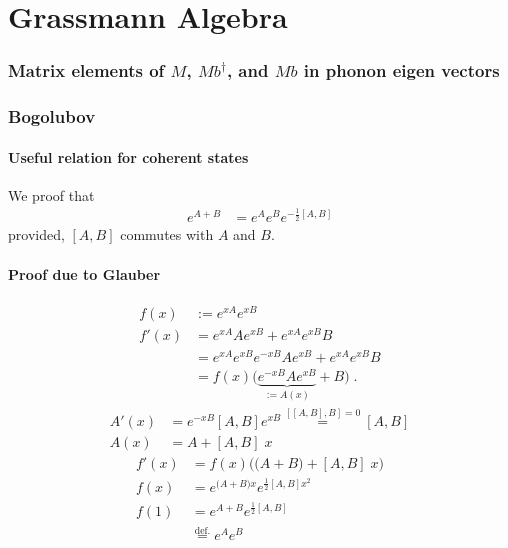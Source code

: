 \newcommand{\sgn}{{\rm sgn}}
\chapter{Grassmann Algebra}
\subsection{Matrix elements of $M$, $M b^{\dagger}$, and $M b$ in phonon eigen vectors
 }
 
 \subsection{Bogolubov}
 
 
 \subsubsection{Useful relation for coherent states}

We proof that 
%
\begin{align}
e^{A+B} &= e^{A} e^{B} e^{-\frac{1}{2}[A,B]}\label{eq:Glauber}
\end{align}
%
provided, $[A,B]$ commutes with $A$ and $B$.
\subsubsection{Proof due to Glauber}
%
\begin{align*}
f(x)&:=e^{x A}e^{x B}\\
f'(x) &=e^{x A}A e^{x B} +e^{x A}e^{x B} B\\
&=e^{x A} e^{x B}  e^{-x B}A e^{x B} +e^{x A}e^{x B} B\\
&=f(x) \bigg(  \underbrace{e^{-x B}A e^{x B}}_{:=A(x)} + B\bigg)\;.
\end{align*}
%
%
\begin{align*}
A'(x) &= e^{-x B}[A,B] e^{x B} \overset{[[A,B],B]=0}{=} [A,B]\\
A(x) &= A + [A,B] \;x
\end{align*}
%
%
\begin{align*}
f'(x) &=f(x) \bigg(\big(A+B\big) + [A,B] \;x\bigg)\\
f(x) &= e^{\big(A+B\big)x} e^{\frac{1}{2}[A,B]x^{2}}\\
f(1)&=  e^{A+B} e^{\frac{1}{2}[A,B]}\\
&\overset{\text{def.}}{=} e^{A}e^{B}
\end{align*}
%
